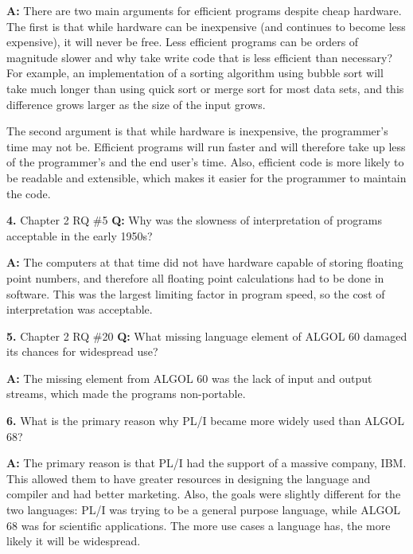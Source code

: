 \documentclass[letterpaper, 11pt]{article}
\newcommand{\hwnumber}[1]{\medskip \noindent\textbf{#1.} \smallskip}
\newcommand{\hwnumbersec}[3]{\medskip \noindent\textbf{#1.} Chapter #2 #3
\newline\noindent\textbf{Q:}}
\newcommand{\A}{\noindent\textbf{A:} }
\begin{document}
\A There are two main arguments for efficient programs despite cheap hardware.
The first is that while hardware can be inexpensive (and continues to become
less expensive), it will never be free. Less efficient programs can be orders of
magnitude slower and why take write code that is less efficient than necessary?
For example, an implementation of a sorting algorithm using bubble sort will
take much longer than using quick sort or merge sort for most data sets, and
this difference grows larger as the size of the input grows. 

The second argument is that while hardware is inexpensive, the programmer's time
may not be. Efficient programs will run faster and will therefore take up less
of the programmer's and the end user's time. Also, efficient code is more
likely to be readable and extensible, which makes it easier for the programmer
to maintain the code. 

\hwnumbersec{4}{2}{RQ \#5}
Why was the slowness of interpretation of programs acceptable in the early
1950s?

\A The computers at that time did not have hardware capable of storing floating
point numbers, and therefore all floating point calculations had to be done in
software. This was the largest limiting factor in program speed, so the cost of
interpretation was acceptable. 

\hwnumbersec{5}{2}{RQ \#20}
What missing language element of ALGOL 60 damaged its chances for widespread
use?

\A The missing element from ALGOL 60 was the lack of input and output streams,
which made the programs non-portable. 

\hwnumber{6}{2}{PS \#13}
What is the primary reason why PL/I became more widely used than ALGOL 68?

\A The primary reason is that PL/I had the support of a massive company, IBM.
This allowed them to have greater resources in designing the language and
compiler and had better marketing. Also, the goals were slightly different for
the two languages: PL/I was trying to be a general purpose language, while
ALGOL 68 was for scientific applications. The more use cases a language has, the
more likely it will be widespread. 
\end{document}
